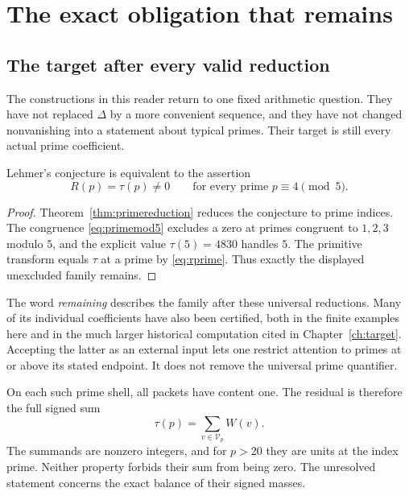 \chapter{The exact obligation that remains}\label{ch:closeout}
\section{The target after every valid reduction}
The constructions in this reader return to one fixed arithmetic question. They have not replaced $\Delta$ by a more convenient sequence, and they have not changed nonvanishing into a statement about typical primes. Their target is still every actual prime coefficient.

\begin{proposition}\label{prop:remainingfamily}
Lehmer's conjecture is equivalent to the assertion
\begin{equation}\label{eq:remainingfamily}
R(p)=\tau(p)\ne0
\qquad\text{for every prime }p\equiv4\pmod5.
\end{equation}
\end{proposition}
\begin{proof}
Theorem~\ref{thm:primereduction} reduces the conjecture to prime indices. The congruence \eqref{eq:primemod5} excludes a zero at primes congruent to $1,2,3$ modulo $5$, and the explicit value $\tau(5)=4830$ handles $5$. The primitive transform equals $\tau$ at a prime by \eqref{eq:rprime}. Thus exactly the displayed unexcluded family remains.
\end{proof}

The word \emph{remaining} describes the family after these universal reductions. Many of its individual coefficients have also been certified, both in the finite examples here and in the much larger historical computation cited in Chapter~\ref{ch:target}. Accepting the latter as an external input lets one restrict attention to primes at or above its stated endpoint. It does not remove the universal prime quantifier.

On each such prime shell, all packets have content one. The residual is therefore the full signed sum
\begin{equation}\label{eq:primepacketobligation}
\tau(p)=\sum_{v\in\mathcal V_p}W(v).
\end{equation}
The summands are nonzero integers, and for $p>20$ they are units at the index prime. Neither property forbids their sum from being zero. The unresolved statement concerns the exact balance of their signed masses.

